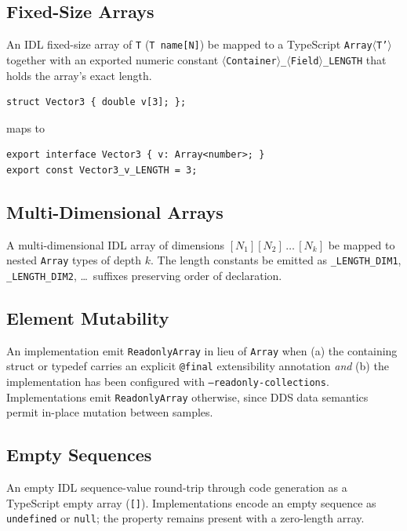 \documentclass{../styles/zerodds-vendor-spec}
\begin{document}
\subsection{Fixed-Size Arrays}

An IDL fixed-size array of \texttt{T} (\texttt{T name[N]})
 be mapped to a TypeScript
\texttt{Array$\langle$T'$\rangle$} together with an exported
numeric constant
\texttt{$\langle$Container$\rangle$\_$\langle$Field$\rangle$\_LENGTH}
that holds the array's exact length.

\begin{specexample}
\begin{lstlisting}
struct Vector3 { double v[3]; };
\end{lstlisting}
maps to
\begin{lstlisting}
export interface Vector3 { v: Array<number>; }
export const Vector3_v_LENGTH = 3;
\end{lstlisting}
\end{specexample}

\subsection{Multi-Dimensional Arrays}

A multi-dimensional IDL array of dimensions
$[N_1][N_2]\,\ldots\,[N_k]$  be mapped to
nested \texttt{Array} types of depth $k$. The
length constants  be emitted as
\texttt{\_LENGTH\_DIM1}, \texttt{\_LENGTH\_DIM2}, \ldots\
suffixes preserving order of declaration.

\subsection{Element Mutability}

An implementation  emit \texttt{ReadonlyArray} in lieu
of \texttt{Array} when (a) the containing struct or typedef
carries an explicit \texttt{@final} extensibility annotation
\emph{and} (b) the implementation has been configured with
\texttt{--readonly-collections}. Implementations  emit \texttt{ReadonlyArray} otherwise, since DDS data
semantics permit in-place mutation between samples.

\subsection{Empty Sequences}

An empty IDL sequence-value  round-trip through code
generation as a TypeScript empty array (\texttt{[]}). Implementations
\rfckw{MUST NOT} encode an empty sequence as \texttt{undefined} or
\texttt{null}; the property remains present with a zero-length
array.
\end{document}

